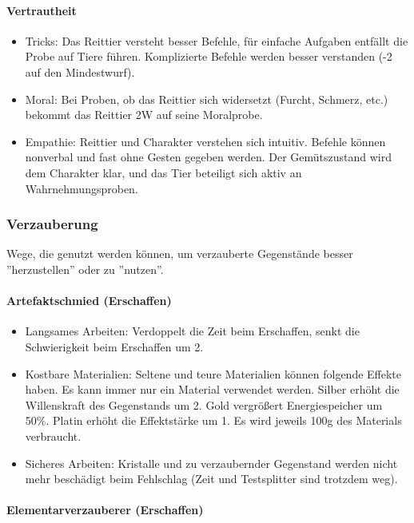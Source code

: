 \documentclass{article}
\begin{document}
\paragraph{Vertrautheit}

\begin{itemize}
\item Tricks: Das Reittier versteht besser Befehle, für einfache Aufgaben entfällt die Probe auf Tiere führen. Komplizierte Befehle werden besser verstanden (-2 auf den Mindestwurf).
\item Moral: Bei Proben, ob das Reittier sich widersetzt (Furcht, Schmerz, etc.) bekommt das Reittier 2W auf seine Moralprobe.
\item Empathie: Reittier und Charakter verstehen sich intuitiv. Befehle können nonverbal und fast ohne Gesten gegeben werden. Der Gemütszustand wird dem Charakter klar, und das Tier beteiligt sich aktiv an Wahrnehmungsproben.
\end{itemize}

\subsubsection{Verzauberung}

Wege, die genutzt werden können, um verzauberte Gegenstände besser ''herzustellen'' oder zu ''nutzen''.

\paragraph{Artefaktschmied (Erschaffen)}

\begin{itemize}
\item Langsames Arbeiten: Verdoppelt die Zeit beim Erschaffen, senkt die Schwierigkeit beim Erschaffen um 2.
\item Kostbare Materialien: Seltene und teure Materialien können folgende Effekte haben. Es kann immer nur ein Material verwendet werden. Silber erhöht die Willenskraft des Gegenstands um 2. Gold vergrößert Energiespeicher um 50\%. Platin erhöht die Effektstärke um 1. Es wird jeweils 100g des Materials verbraucht.
\item Sicheres Arbeiten: Kristalle und zu verzaubernder Gegenstand werden nicht mehr beschädigt beim Fehlschlag (Zeit und Testsplitter sind trotzdem weg).
\end{itemize}

\paragraph{Elementarverzauberer (Erschaffen)}
\end{document}
